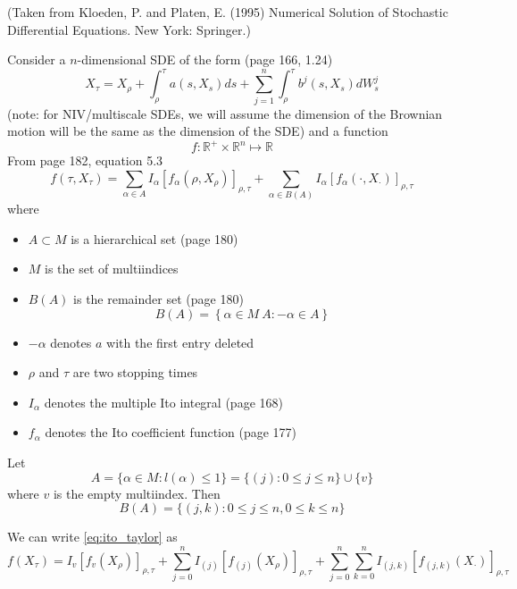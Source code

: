 \documentclass[12pt]{article}
\begin{document}
(Taken from Kloeden, P. and Platen, E. (1995) Numerical Solution of Stochastic Differential Equations. New York: Springer.)

Consider a $n$-dimensional SDE of the form (page 166, 1.24)
%
\begin{equation}
X_\tau = X_\rho + \int_\rho^\tau a(s, X_s) ds + \sum_{j=1}^n \int_\rho^\tau b^j (s, X_s) dW_s^j
\end{equation}
(note: for NIV/multiscale SDEs, we will assume the dimension of the Brownian motion will be the same as the dimension of the SDE)
%
and a function 
$$f: \mathbb{R}^{+} \times \mathbb{R}^n \mapsto \mathbb{R}$$
%
From page 182, equation 5.3
%
\begin{equation} \label{eq:ito_taylor}
f(\tau, X_\tau) = \sum_{\alpha \in A} I_\alpha [f_\alpha(\rho, X_\rho)]_{\rho, \tau} + \sum_{\alpha \in B(A)} I_\alpha [f_\alpha (\cdot, X_\cdot)]_{\rho, \tau}
\end{equation}
where 
\begin{itemize}
\item $A \subset M$ is a hierarchical set (page 180)
\item $M$ is the set of multiindices 
\item  $B(A)$ is the remainder set (page 180)
$$B(A) = \left\{ \alpha \in M \ A: -\alpha \in A \right\}$$
\item  $-\alpha$ denotes $a$ with the first entry deleted
\item $\rho$ and $\tau$ are two stopping times
\item $I_\alpha$ denotes the multiple Ito integral (page 168)
\item $f_\alpha$ denotes the Ito coefficient function (page 177)
\end{itemize}


Let 
$$ A = \{ \alpha \in M : l(\alpha) \le 1 \} = \{ (j) : 0 \le j \le n \} \cup \{v \}$$
where $v$ is the empty multiindex.
%
Then
$$B(A) = \{ (j, k) : 0 \le j \le n, 0 \le k \le n \}$$

We can write \eqref{eq:ito_taylor} as
\begin{equation} \label{eq:ito_taylor2}
f( X_\tau) = I_{v} [f_{v} ( X_\rho)]_{\rho, \tau} + \sum_{j=0}^n I_{(j)} [f_{(j)}( X_\rho)]_{\rho, \tau} + \sum_{j=0}^n \sum_{k=0}^n I_{(j,k)} [f_{(j,k)} ( X_\cdot)]_{\rho, \tau}
\end{equation}
\end{document}
